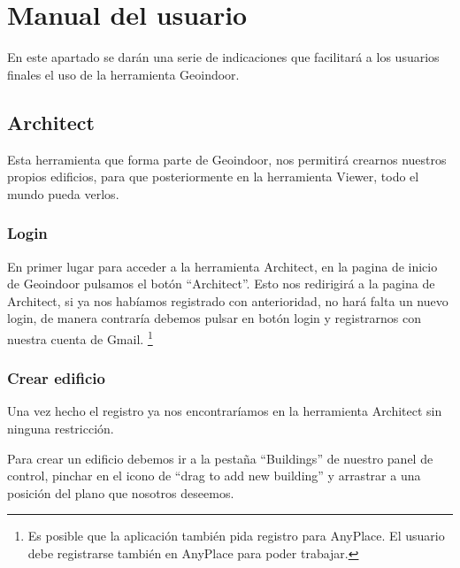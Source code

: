 

\section{Manual del usuario}

En este apartado se darán una serie de indicaciones que facilitará a los usuarios finales el uso de la herramienta Geoindoor.


\subsection{Architect}

Esta herramienta que forma parte de Geoindoor, nos permitirá crearnos nuestros propios edificios, para que posteriormente en la herramienta Viewer, todo el mundo pueda verlos.


\subsubsection{Login}

En primer lugar para acceder a la herramienta Architect, en la pagina de inicio de Geoindoor pulsamos el botón ``Architect''. Esto nos redirigirá a la pagina de Architect, si ya nos habíamos registrado con anterioridad, no hará falta un nuevo login, de manera contraría debemos pulsar en botón login y registrarnos con nuestra cuenta de Gmail. \footnote{Es posible que la aplicación también pida registro para AnyPlace. El usuario debe registrarse también en AnyPlace para poder trabajar.}



\subsubsection{Crear edificio}

Una vez hecho el registro ya nos encontraríamos en la herramienta Architect sin ninguna restricción.

Para crear un edificio debemos ir a la pestaña ``Buildings'' de nuestro panel de control, pinchar en el icono de ``drag to add new building'' y arrastrar a una posición del plano que nosotros deseemos.

